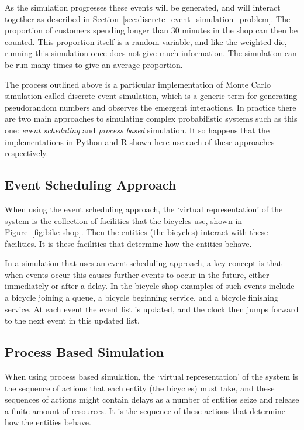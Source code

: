 As the simulation progresses these events will be generated, and will interact
together as described in Section~\ref{sec:discrete_event_simulation_problem}.
The proportion of customers spending longer than 30 minutes in the shop can then
be counted. This proportion itself is a random variable, and like the
weighted die, running this simulation once does not give much information.
The simulation can be run many times to give an average proportion.

The process outlined above is a particular implementation of Monte Carlo
simulation called discrete event simulation, which
is a generic term for generating pseudorandom numbers and observes the emergent
interactions. In practice there are two main approaches to simulating complex
probabilistic systems such as this one: \textit{event scheduling} and
\textit{process based} simulation. It so happens that the implementations in
Python and R shown here use each of these approaches respectively.

\subsection{Event Scheduling Approach}

When using the event scheduling approach, the `virtual representation' of the
system is the collection of facilities that the bicycles use, shown in
Figure~\ref{fig:bike-shop}. Then the entities (the bicycles) interact with these
facilities. It is these facilities that determine how the entities behave.

In a simulation that uses an event scheduling approach, a key concept is that
when events occur this causes further events to occur in the future, either
immediately or after a delay.
In the bicycle shop examples of such events include a bicycle joining a
queue, a bicycle beginning service, and a bicycle finishing
service. At each event the event list is updated, and the clock then jumps
forward to the next event in this updated list.

\subsection{Process Based Simulation}

When using process based simulation, the `virtual
representation' of the system is the sequence of actions that each entity
(the bicycles) must take, and these sequences of actions might contain delays as
a number of entities seize and release a finite amount of resources. It is the
sequence of these actions that determine how the entities behave.

